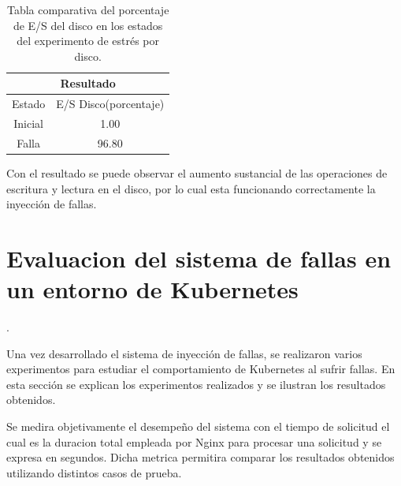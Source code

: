 
\begin{table}[ht!]
\begin{center}
\begin{tabular}{ |c|c| } 
 \hline
 \multicolumn{2}{|c|}{Resultado} \\
 \hline
 \hline
 Estado & E/S Disco(porcentaje)\\
 \hline
 Inicial & 1.00\\
 Falla & 96.80\\
 \hline
\end{tabular}
\end{center}
\caption{Tabla comparativa del porcentaje de E/S del disco en los estados del experimento de estrés por disco.}
\label{tab:tabla44}
\end{table}

\par Con el resultado se puede observar el aumento sustancial de las operaciones de escritura y lectura en el disco, por lo cual esta funcionando correctamente la inyección de fallas.\\



\section{Evaluacion del sistema de fallas en un entorno de Kubernetes}

.


\par Una vez desarrollado el sistema de inyección de fallas, se realizaron varios experimentos para estudiar el comportamiento de Kubernetes al sufrir fallas. En esta sección se explican los experimentos realizados y se ilustran los resultados obtenidos.\\


\par Se medira objetivamente el desempeño del sistema con el tiempo de solicitud el cual es la duracion total empleada por Nginx para procesar una solicitud y se expresa en segundos. Dicha metrica permitira comparar los resultados obtenidos utilizando distintos casos de prueba.\\


